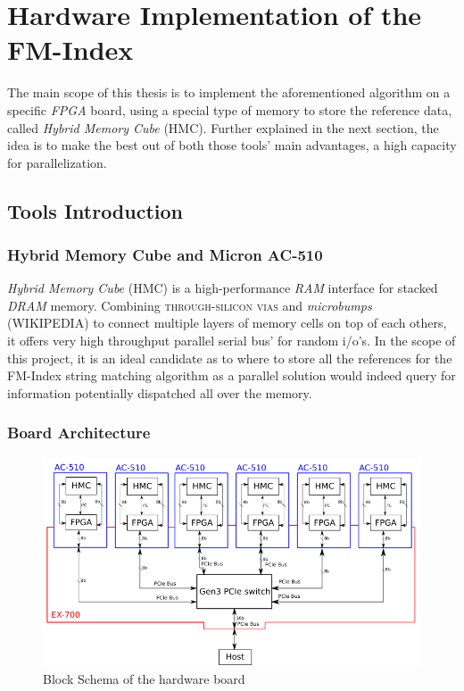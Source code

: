 
\chapter{Hardware Implementation of the FM-Index} %

\label{Chapter3} %
The main scope of this thesis is to implement the aforementioned algorithm on a specific \textsl{FPGA} board, using a special type of memory to store the reference data, called \textsl{Hybrid Memory Cube} (HMC). Further explained in the next section, the idea is to make the best out of both those tools' main advantages, a high capacity for parallelization.


\section{Tools Introduction}

\subsection{Hybrid Memory Cube and Micron AC-510}


\textsl{Hybrid Memory Cube} (HMC) is a high-performance \textsl{RAM} interface for stacked \textsl{DRAM} memory. Combining \textsc{through-silicon vias} and \textsl{microbumps} (WIKIPEDIA) to connect multiple layers of memory cells on top of each others, it offers very high throughput parallel serial bus' for random i/o's. In the scope of this project, it is an ideal candidate as to where to store all the references for the  FM-Index string matching algorithm as a parallel solution would indeed query for information potentially dispatched all over the memory.


\subsection{Board Architecture}

\begin{figure}[H]
    \centering
    \includegraphics[scale = 0.5]{Figures/pico_board.png}
    \caption{Block Schema of the hardware board}
    \label{fig:my_label}
\end{figure}

